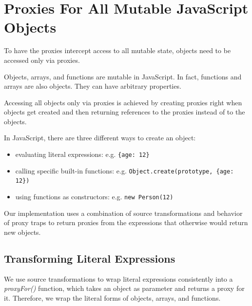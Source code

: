 \section{Proxies For All Mutable JavaScript Objects}

To have the proxies intercept access to all mutable state, objects need to be accessed only via proxies.

Objects, arrays, and functions are mutable in JavaScript.
In fact, functions and arrays are also objects.
They can have arbitrary properties.



Accessing all objects only via proxies is achieved by creating proxies right when objects get created and then returning references to the proxies instead of to the objects.


In JavaScript, there are three different ways to create an object: 
\begin{itemize}
    \item evaluating literal expressions: e.g. \lstinline|{age: 12}|
    \item calling specific built-in functions: e.g. \lstinline|Object.create(prototype, {age: 12})|
    \item using functions as constructors: e.g. \lstinline|new Person(12)|
\end{itemize}



Our implementation uses a combination of source transformations and behavior of proxy traps to return proxies from the expressions that otherwise would return new objects.




\subsection{Transforming Literal Expressions}

We use source transformations to wrap literal expressions consistently into a \emph{proxyFor()} function, which takes an object as parameter and returns a proxy for it.
Therefore, we wrap the literal forms of objects, arrays, and functions.

